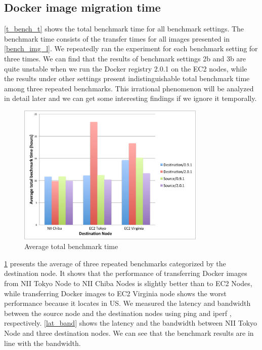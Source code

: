 \documentclass{ieicej}
\begin{document}
\subsection{Docker image migration time}
\cref{t_bench_t} shows the total benchmark time for all benchmark settings. The benchmark time consists of the transfer times for all images presented in \cref{bench_img_l}.
We repeatedly ran the experiment for each benchmark setting for three times.
We can find that the results of benchmark settings 2b and 3b are quite unstable when we run the Docker registry 2.0.1 on the EC2 nodes, while the results under other settings present indistinguishable total benchmark time among three repeated benchmarks.
This irrational phenomenon will be analyzed in detail later and we can get some interesting findings if we ignore it temporally.

\begin{figure}[ht]
  \begin{center}
  \includegraphics[width=0.8\textwidth,natwidth=1000,natheight=800]{3_Average_total_benchmark_time.pdf}
  \end{center}
  \caption{Average total benchmark time}
  \label{avg_bench_time}
\end{figure}


\cref{avg_bench_time} presents the average of three repeated benchmarks categorized by the destination node.
It shows that the performance of transferring Docker images from NII Tokyo Node to NII Chiba Nodes is slightly better than to EC2 Nodes, while transferring Docker images to EC2 Virginia node shows the worst performance because it locates in US.
We measured the latency and bandwidth between the source node and the destination nodes using ping and iperf \cite{iperf2015}, respectively.
\cref{lat_band} shows the latency and the bandwidth between NII Tokyo Node and three destination nodes. We can see that the benchmark results are in line with the bandwidth.
\end{document}
